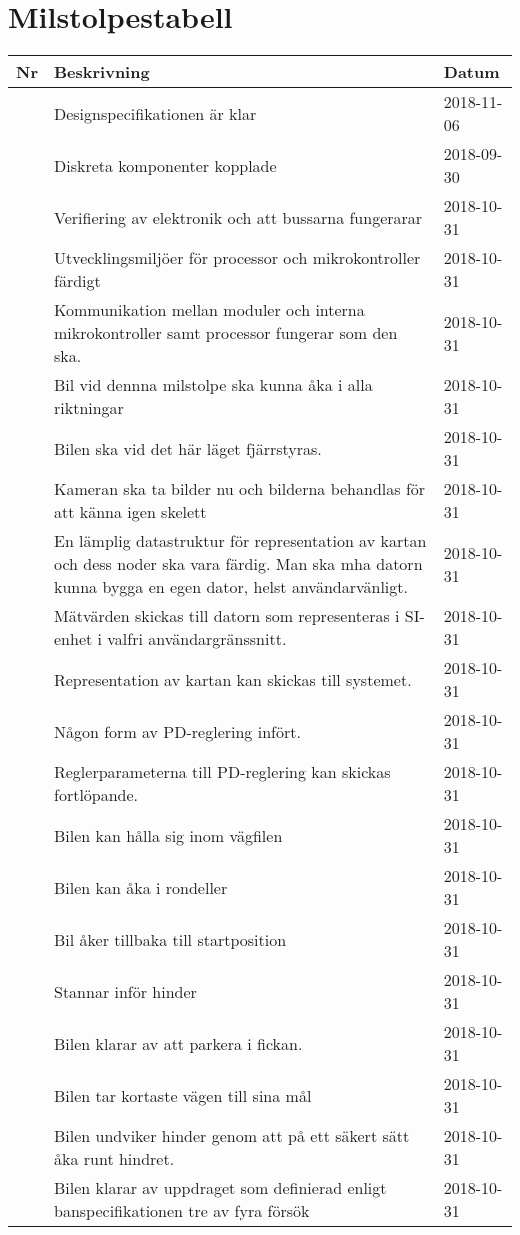 \documentclass[projektplan/plan.tex]{subfiles}
\newcounter{milestoneNo} %
\newenvironment{milestonelist}
{
    \setlength{\tabcolsep}{12pt}
    \renewcommand{\arraystretch}{1.6}
    \begin{longtable}{p{8mm}p{75mm}p{25mm}}
        \bfseries Nr &
        \bfseries Beskrivning &
        \bfseries Datum 
	\\\hline\endhead
}{
    \end{longtable}
}
\newcommand{\milestone}[2]{
    \stepcounter{milestoneNo}
    \arabic{milestoneNo} & #1     & #2 \\
}
\begin{document}
\section{Milstolpestabell}

\begin{milestonelist}

\milestone{Designspecifikationen är klar}{2018-11-06}
\milestone{Diskreta komponenter kopplade}{2018-09-30}
\milestone{Verifiering av elektronik och att bussarna fungerarar}{2018-10-31}

\milestone{Utvecklingsmiljöer för processor och mikrokontroller
    färdigt}{2018-10-31}
\milestone{Kommunikation mellan moduler och interna mikrokontroller samt
    processor fungerar som den ska.}{2018-10-31}

\milestone{Bil vid dennna milstolpe ska kunna åka i alla
    riktningar}{2018-10-31}

\milestone{Bilen ska vid det här läget fjärrstyras.}{2018-10-31}

\milestone{Kameran ska ta bilder nu och bilderna behandlas för att känna igen
    skelett}{2018-10-31}

\milestone{En lämplig datastruktur för representation av kartan och dess noder
    ska vara färdig. Man ska mha datorn kunna bygga en egen dator, helst
    användarvänligt.}{2018-10-31}

\milestone{Mätvärden skickas till datorn som representeras i SI-enhet i valfri
    användargränssnitt.}{2018-10-31}

\milestone{Representation av kartan kan skickas till systemet.}{2018-10-31}

\milestone{Någon form av PD-reglering infört.}{2018-10-31}

\milestone{Reglerparameterna till PD-reglering kan skickas
    fortlöpande.}{2018-10-31}

\milestone{Bilen kan hålla sig inom vägfilen}{2018-10-31}

\milestone{Bilen kan åka i rondeller}{2018-10-31}

\milestone{Bil åker tillbaka till startposition}{2018-10-31}

\milestone{Stannar inför hinder}{2018-10-31}

\milestone{Bilen klarar av att parkera i fickan.}{2018-10-31}

\milestone{Bilen tar kortaste vägen till sina mål}{2018-10-31}

\milestone{Bilen undviker hinder genom att på ett säkert sätt åka runt
    hindret.}{2018-10-31}

\milestone{Bilen klarar av uppdraget som definierad enligt banspecifikationen
    tre av fyra försök}{2018-10-31}

\end{milestonelist}

\newpage
\end{document}
